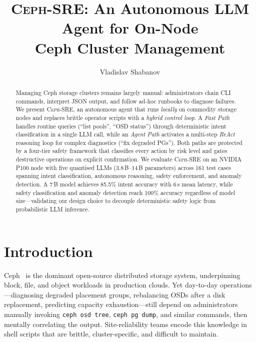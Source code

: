 \documentclass[sigplan,nonacm,10pt]{acmart}
\newcommand{\sysname}{\textsc{Ceph-SRE}\xspace}
\begin{document}
\title{\sysname: An Autonomous LLM Agent for On-Node\\Ceph Cluster Management}

\author{Vladislav Shabanov}

\begin{abstract}
Managing Ceph storage clusters remains largely manual: administrators
chain CLI commands, interpret JSON output, and follow ad-hoc runbooks
to diagnose failures.
We present \sysname, an autonomous agent that runs \emph{locally} on
commodity storage nodes and replaces brittle operator scripts with a
\emph{hybrid control loop}.
A \emph{Fast Path} handles routine queries (``list pools'', ``OSD
status'') through deterministic intent classification in a single
LLM call, while an \emph{Agent Path} activates a multi-step
\emph{ReAct} reasoning loop for complex diagnostics
(``fix degraded PGs'').
Both paths are protected by a four-tier safety framework that
classifies every action by risk level and gates destructive operations
on explicit confirmation.
We evaluate \sysname on an NVIDIA P100 node with five quantised
LLMs (3.8\,B--14\,B parameters) across 161 test cases spanning
intent classification, autonomous reasoning, safety enforcement,
and anomaly detection.
A 7\,B model achieves 85.5\% intent accuracy with 6\,s mean latency,
while safety classification and anomaly detection reach 100\%
accuracy regardless of model size---validating our design choice to
decouple deterministic safety logic from probabilistic LLM inference.
\end{abstract}

\maketitle

\section{Introduction}\label{sec:intro}

Ceph~\cite{weil2006ceph} is the dominant open-source distributed
storage system, underpinning block, file, and object workloads in
production clouds.
Yet day-to-day operations---diagnosing degraded placement groups,
rebalancing OSDs after a disk replacement, predicting capacity
exhaustion---still depend on administrators manually invoking
\texttt{ceph osd tree}, \texttt{ceph pg dump}, and similar commands,
then mentally correlating the output.
Site-reliability teams encode this knowledge in shell scripts that
are brittle, cluster-specific, and difficult to maintain.
\end{document}
